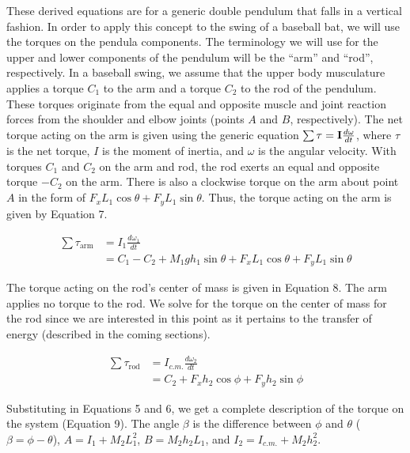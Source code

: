 \documentclass[%
 aip,
 amsmath,amssymb,
 reprint,%
 floatfix,%
]{revtex4-1}
\begin{document}
These derived equations are for a generic double pendulum that falls in a vertical fashion. In order to apply this concept to the swing of a baseball bat, we will use the torques on the pendula components. The terminology we will use for the upper and lower components of the pendulum will be the “arm” and “rod”, respectively. In a baseball swing, we assume that the upper body musculature applies a torque $C_1$ to the arm and a torque $C_2$ to the rod of the pendulum. These torques originate from the equal and opposite muscle and joint reaction forces from the shoulder and elbow joints\cite{Cross2005} (points $A$ and $B$, respectively). The net torque acting on the arm is given using the generic equation $\sum \bold{\tau} = \bold{I} \frac{d \bold{\omega}}{dt}$, where $\tau$ is the net torque, $I$ is the moment of inertia, and $\omega$ is the angular velocity. With torques $C_1$ and $C_2$ on the arm and rod, the rod exerts an equal and opposite torque $-C_2$ on the arm. There is also a clockwise torque on the arm about point $A$ in the form of $F_x L_1 \cos{\theta} + F_y L_1 \sin{\theta}$. Thus, the torque acting on the arm is given by Equation 7.

\begin{equation}
	\begin{aligned}
		\sum \tau_{\text{arm}} & = I_1 \frac{d \omega_1}{dt} \\ 
			  & = C_1 - C_2 + M_1 g h_1 \sin{\theta} + F_x L_1 \cos{\theta} + F_y L_1 \sin{\theta}
	\end{aligned}
\end{equation}

The torque acting on the rod's center of mass is given in Equation 8. The arm applies no torque to the rod. We solve for the torque on the center of mass for the rod since we are interested in this point as it pertains to the transfer of energy (described in the coming sections).

\begin{equation}
	\begin{aligned}
		\sum \tau_{\text{rod}} & = I_{c.m.} \frac{d \omega_2}{dt} \\ 
			  & = C_2 + F_x h_2 \cos{\phi} + F_y h_2 \sin{\phi}
	\end{aligned}
\end{equation}

Substituting in Equations 5 and 6, we get a complete description of the torque on the system (Equation 9). The angle $\beta$ is the difference between $\phi$ and $\theta$ ($\beta = \phi - \theta$), $A=I_1+M_2L_1^2$, $B=M_2h_2L_1$, and $I_2=I_{c.m.}+M_2h_2^2$.
\end{document}

